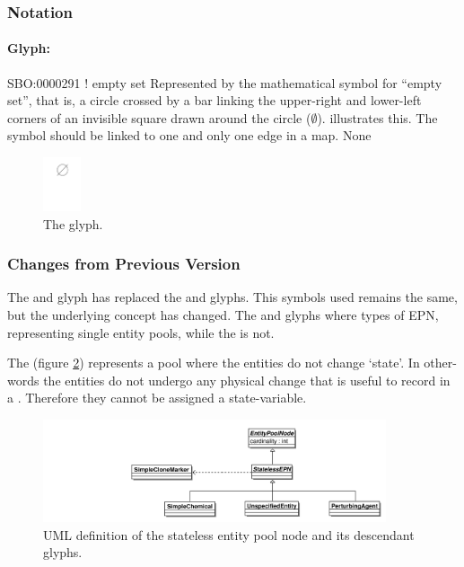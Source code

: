 \subsubsection{Notation}

\paragraph{Glyph: }

\begin{glyphDescription}
\glyphSboTerm SBO:0000291 ! empty set
\glyphContainer Represented by the mathematical symbol for ``empty
set'', that is, a circle crossed by a bar linking the upper-right and
lower-left corners of an invisible square drawn around the circle ($\emptyset$).
 illustrates this.  The symbol should be linked to one
and only one edge in a map.
\glyphLabel None
\end{glyphDescription}

\begin{figure}[htb]
  \centering
  \includegraphics[width = 0.1\textwidth]{images/sourceSink}
  \caption{The  glyph.}
  \label{fig:techref:sourceSink}
\end{figure}

\subsubsection{Changes from Previous Version}

The  and  glyph has replaced the
 and  glyphs. This symbols used remains the
same, but the underlying concept has changed. The  and
 glyphs where types of EPN, representing single entity
pools, while the  is not.

\label{defn:StatelessEPN}

The  (figure \ref{fig:techref:statelessepnuml})
represents a pool where the entities do not change `state'. In
other-words the entities do not undergo any physical change that is
useful to record in a \PDm. Therefore they cannot be assigned
a state-variable.

\begin{figure}[htb]
  \centering
  \includegraphics[width=0.9\textwidth]{images/statelessepnuml}
  \caption{UML definition of the stateless entity pool node and its
    descendant glyphs.}
  \label{fig:techref:statelessepnuml}
\end{figure}

